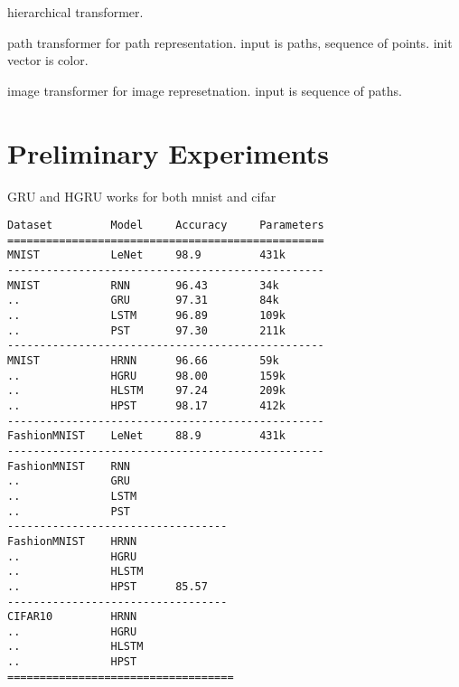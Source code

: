 \documentclass[10pt,twocolumn,letterpaper]{article}
\begin{document}
hierarchical transformer.

path transformer for path representation. input is paths, sequence of points. init vector is color.

image transformer for image represetnation. input is sequence of paths.

\section{Preliminary Experiments}

GRU and HGRU works for both mnist and cifar

\begin{verbatim}
Dataset         Model     Accuracy     Parameters
=================================================
MNIST           LeNet     98.9         431k
-------------------------------------------------
MNIST           RNN       96.43        34k
..              GRU       97.31        84k
..              LSTM      96.89        109k
..              PST       97.30        211k
-------------------------------------------------
MNIST           HRNN      96.66        59k
..              HGRU      98.00        159k
..              HLSTM     97.24        209k
..              HPST      98.17        412k
-------------------------------------------------
FashionMNIST    LeNet     88.9         431k
-------------------------------------------------
FashionMNIST    RNN
..              GRU
..              LSTM
..              PST
----------------------------------
FashionMNIST    HRNN
..              HGRU
..              HLSTM
..              HPST      85.57
----------------------------------
CIFAR10         HRNN
..              HGRU
..              HLSTM
..              HPST
===================================
\end{verbatim}


{\small


}
\end{document}
